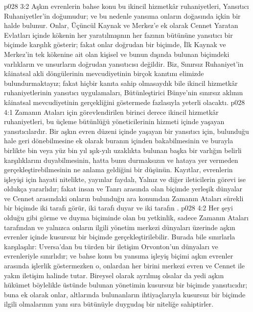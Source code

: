 \vs p028 3:2 Aşkın evrenlerin bahse konu bu ikincil hizmetkâr ruhaniyetleri, Yansıtıcı Ruhaniyetler’in doğumudur; ve bu nedenle yansıma onların doğasında içkin bir halde bulunur. Onlar, Üçüncül Kaynak ve Merkez’e ek olarak Cennet Yaratan Evlatları içinde kökenin her yaratılmışının her fazının bütününe yansıtıcı bir biçimde karşılık gösterir; fakat onlar doğrudan bir biçimde, İlk Kaynak ve Merkez’in tek kökenine ait olan kişisel ve bunun dışında bulunan biçimdeki varlıkların ve unsurların doğrudan yansıtıcısı değildir. Biz, Sınırsız Ruhaniyet’in kâinatsal akli döngülerinin mevcudiyetinin birçok kanıtını elimizde bulundurmaktayız; fakat hiçbir kanıta sahip olmasaydık bile ikincil hizmetkâr ruhaniyetlerinin yansıtıcı uygulamaları, Bütünleştirici Bünye’nin sınırsız aklının kâinatsal mevcudiyetinin gerçekliğini göstermede fazlasıyla yeterli olacaktı.
\vs p028 4:1 Zamanın Ataları için görevlendirilen birinci derece ikincil hizmetkâr ruhaniyetleri, bu üçleme bütünlüğü yöneticilerinin hizmeti içinde yaşayan yansıtıcılardır. Bir aşkın evren düzeni içinde yaşayan bir yansıtıcı için, bulunduğu hale geri dönebilmesine ek olarak buranın içinden bakabilmesinin ve burayla birlikte bin veya yüz bin yıl ışık\hyp{}yılı uzaklıkta bulunan başka bir varlığın belirli karşılıklarını duyabilmesinin, hatta bunu durmaksızın ve hataya yer vermeden gerçekleştirebilmesinin ne anlama geldiğini bir düşünün. Kayıtlar, evrenlerin işleyişi için hayati nitelikte, yayınlar faydalı, Yalnız ve diğer ileticilerin görevi ise oldukça yararlıdır; fakat insan ve Tanrı arasında olan biçimde yerleşik dünyalar ve Cennet arasındaki onların bulunduğu ara konumdan Zamanın Ataları sürekli bir biçimde iki tarafı görür, iki tarafı duyar ve iki tarafın .
\vs p028 4:2 Her şeyi olduğu gibi görme ve duyma biçiminde olan bu yetkinlik, sadece Zamanın Ataları tarafından ve yalnızca onların ilgili yönetim merkezi dünyaları üzerinde aşkın evrenler içinde kusursuz bir biçimde gerçekleştirilebilir. Burada bile sınırlarla karşılaşılır: Uversa’dan bu türden bir iletişim Orvonton’un dünyaları ve evrenleriyle sınırlıdır; ve bahse konu bu yansıma işleyiş biçimi aşkın evrenler arasında işlerlik göstermezken o, onlardan her birini merkezi evren ve Cennet ile yakın iletişim halinde tutar. Bireysel olarak ayrılmış olsalar da yedi aşkın hükümet böylelikle üstünde bulunan yönetimin kusursuz bir biçimde yansıtıcıdır; buna ek olarak onlar, altlarında bulunanların ihtiyaçlarıyla kusursuz bir biçimde ilgili olmalarının yanı sıra bütünüyle duygudaş bir niteliğe sahiptirler.
